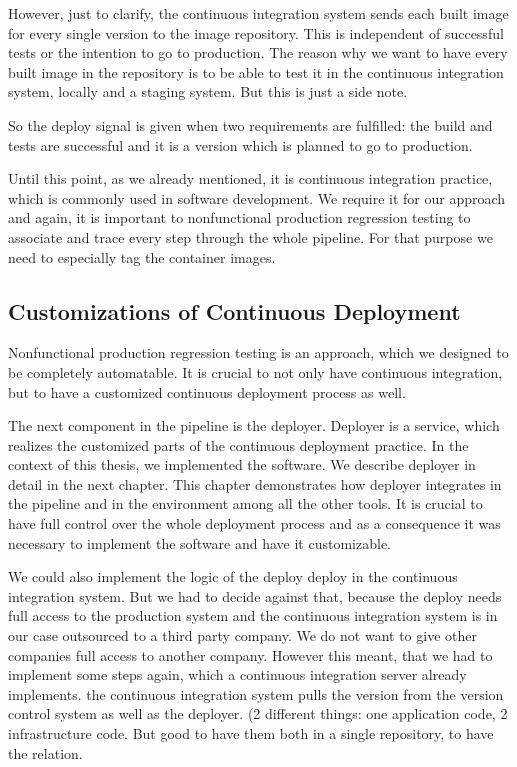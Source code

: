 However, just to clarify, the continuous integration system sends each built image for every single version to the image repository. This is independent of successful tests or the intention to go to production. The reason why we want to have every built image in the repository is to be able to test it in the continuous integration system, locally and a staging system. But this is just a side note.

So the deploy signal is given when two requirements are fulfilled: the build and tests are
successful and it is a version which is planned to go to production.

Until this point, as we already mentioned, it is continuous integration practice, which is
commonly used in software development. We require it for our approach and again, it is
important to nonfunctional production regression testing to associate and trace every step
through the whole pipeline. For that purpose we need to especially tag the container
images.

\subsection{Customizations of Continuous Deployment}

Nonfunctional production regression testing is an approach, which we designed to be
completely automatable. It is crucial to not only have continuous integration, but to have
a customized continuous deployment process as well.

The next component in the pipeline is the deployer. Deployer is a service, which realizes
the customized parts of the continuous deployment practice. In the context of this thesis,
we implemented the software. We describe deployer in detail in the next chapter. This
chapter demonstrates how deployer integrates in the pipeline and in the environment among
all the other tools. It is crucial to have full control over the whole deployment process
and as a consequence it was necessary to implement the software and have it customizable.

We could also implement the logic of the deploy deploy in the continuous integration
system. But we had to decide against that, because the deploy needs full access to the
production system and the continuous integration system is in our case outsourced to a
third party company. We do not want to give other companies full access to another
company. However this meant, that we had to implement some steps again, which a continuous
integration server already implements.  the continuous integration system pulls the
version from the version control system as well as the deployer. (2 different things: one
application code, 2 infrastructure code. But good to have them both in a single
repository, to have the relation.

